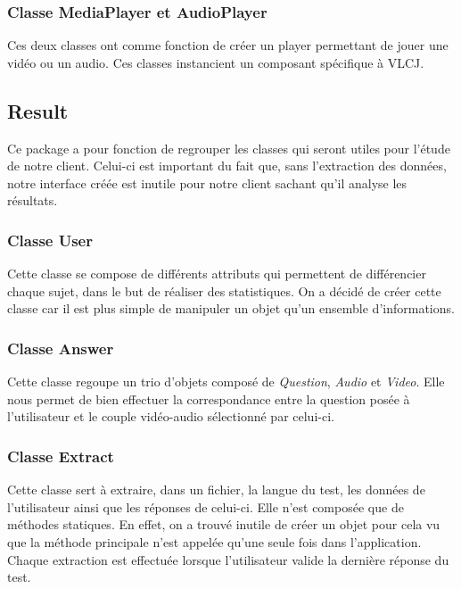 \subsubsection{Classe MediaPlayer et AudioPlayer}\label{players}

Ces deux classes ont comme fonction de créer un player permettant de jouer une vidéo ou un audio. Ces classes instancient un composant spécifique à VLCJ. 

\subsection{Result}\label{Archi_Results}

Ce package a pour fonction de regrouper les classes qui seront utiles pour l'étude de notre client. Celui-ci est important du fait que, sans l'extraction des données, notre interface créée est inutile pour notre client sachant qu'il analyse les résultats.

\subsubsection{Classe User}

Cette classe se compose de différents attributs qui permettent de différencier chaque sujet, dans le but de réaliser des statistiques. On a décidé de créer cette classe car il est plus simple de manipuler un objet qu'un ensemble d'informations.

\subsubsection{Classe Answer}

Cette classe regoupe un trio d'objets composé de \textit{Question}, \textit{Audio} et \textit{Video}. Elle nous permet de bien effectuer la correspondance entre la question posée à l'utilisateur et le couple vidéo-audio sélectionné par celui-ci.

\subsubsection{Classe Extract}

Cette classe sert à extraire, dans un fichier, la langue du test, les données de l'utilisateur ainsi que les réponses de celui-ci. Elle n'est composée que de méthodes statiques. En effet, on a trouvé inutile de créer un objet pour cela vu que la méthode principale n'est appelée qu'une seule fois dans l'application. Chaque extraction est effectuée lorsque l'utilisateur valide la dernière réponse du test.

